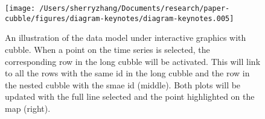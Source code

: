 \documentclass[
]{jss}
\begin{document}
\begin{CodeChunk}
\begin{figure}

{\centering \texttt{[image: /Users/sherryzhang/Documents/research/paper-cubble/figures/diagram-keynotes/diagram-keynotes.005]} 

}

\caption[An illustration of the data model under interactive graphics with cubble]{An illustration of the data model under interactive graphics with cubble. When a point on the time series is selected, the corresponding row in the long cubble will be activated. This will link to all the rows with the same id in the long cubble and the row in the nested cubble with the smae id (middle). Both plots will be updated with the full line selected and the point highlighted on the map (right).}\label{fig:illu-interactive-2}
\end{figure}
\end{CodeChunk}

\newpage


\end{document}
